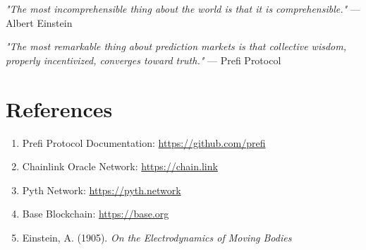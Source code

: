 \documentclass[12pt,a4paper]{article}
\begin{document}
\vspace{1em}

\textit{"The most incomprehensible thing about the world is that it is comprehensible."} — Albert Einstein

\textit{"The most remarkable thing about prediction markets is that collective wisdom, properly incentivized, converges toward truth."} — Prefi Protocol

\section*{References}

\begin{enumerate}
\item Prefi Protocol Documentation: \url{https://github.com/prefi}
\item Chainlink Oracle Network: \url{https://chain.link}
\item Pyth Network: \url{https://pyth.network}
\item Base Blockchain: \url{https://base.org}
\item Einstein, A. (1905). \textit{On the Electrodynamics of Moving Bodies}
\end{enumerate}
\end{document}

